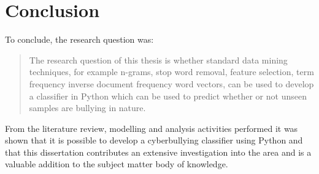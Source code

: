 \section{Conclusion}
To conclude, the research question was:

\begin{quote}
The research question of this thesis is whether standard data mining techniques, for example n-grams, stop word removal, feature selection, term frequency inverse document frequency word vectors, can be used to develop a classifier in Python which can be used to predict whether or not unseen samples are bullying in nature.
\end{quote}

From the literature review, modelling and analysis activities performed it was shown that it is possible to develop a cyberbullying classifier using Python and that this dissertation contributes an extensive investigation into the area and is a valuable addition to the subject matter body of knowledge.
